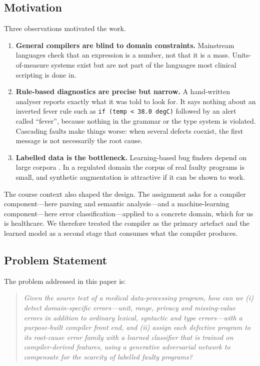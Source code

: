 \documentclass[conference]{IEEEtran}
\newcommand{\code}[1]{\texttt{#1}}
\begin{document}
\subsection{Motivation}

Three observations motivated the work.

\begin{enumerate}
    \item \textbf{General compilers are blind to domain constraints.} Mainstream languages check that an
    expression is a number, not that it is a mass. Units-of-measure systems exist
    \cite{kennedy1994} but are not part of the languages most clinical scripting is done in.
    \item \textbf{Rule-based diagnostics are precise but narrow.} A hand-written analyser reports exactly what it
    was told to look for. It says nothing about an inverted fever rule such as
    \code{if (temp < 38.0 degC)} followed by an alert called ``fever'', because nothing in the grammar or the
    type system is violated. Cascading faults make things worse: when several defects coexist, the first message
    is not necessarily the root cause.
    \item \textbf{Labelled data is the bottleneck.} Learning-based bug finders depend on large corpora
    \cite{allamanis2018,pradel2018}. In a regulated domain the corpus of real faulty programs is small, and
    synthetic augmentation is attractive if it can be shown to work.
\end{enumerate}

The course context also shaped the design. The assignment asks for a compiler component---here parsing and
semantic analysis---and a machine-learning component---here error classification---applied to a concrete
domain, which for us is healthcare. We therefore treated the compiler as the primary artefact and the learned
model as a second stage that consumes what the compiler produces.

\subsection{Problem Statement}

The problem addressed in this paper is:

\begin{quote}
\textit{Given the source text of a medical data-processing program, how can we (i) detect domain-specific
errors---unit, range, privacy and missing-value errors in addition to ordinary lexical, syntactic and type
errors---with a purpose-built compiler front end, and (ii) assign each defective program to its root-cause error
family with a learned classifier that is trained on compiler-derived features, using a generative adversarial
network to compensate for the scarcity of labelled faulty programs?}
\end{quote}
\end{document}
